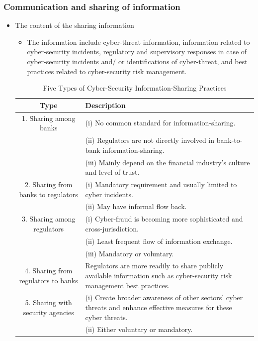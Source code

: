 \subsubsection{Communication and sharing of information}
\begin{itemize}
\item The content of the sharing information
    \begin{itemize}
    \item The information include cyber-threat information, information related to cyber-security incidents, regulatory and supervisory responses in case of cyber-security incidents and/ or identifications of cyber-threat, and best practices related to cyber-security risk management.
    
    \end{itemize}

    \begin{table}[H]
        \centering
        \caption{Five Types of Cyber-Security Information-Sharing Practices}
        \renewcommand{\arraystretch}{1.5} %

        \begin{tabular}{|c|p{12cm}|}
            \hline
            \textbf{Type} & \textbf{Description} \\ \hline
            1. Sharing among banks & (i) No common standard for information-sharing. \\& (ii) Regulators are not directly involved in bank-to-bank information-sharing. \\& (iii) Mainly depend on the financial industry’s culture and level of trust. \\ \hline
            2. Sharing from banks to regulators & (i) Mandatory requirement and usually limited to cyber incidents. \\&(ii) May have informal flow back. \\ \hline
            3. Sharing among regulators & (i) Cyber-fraud is becoming more sophisticated and cross-jurisdiction. \\&(ii) Least frequent flow of information exchange. \\&(iii) Mandatory or voluntary. \\ \hline
            4. Sharing from regulators to banks & Regulators are more readily to share publicly available information such as cyber-security risk management best practices. \\ \hline
            5. Sharing with security agencies & (i) Create broader awareness of other sectors’ cyber threats and enhance effective measures for these cyber threats. \\&(ii) Either voluntary or mandatory. \\ \hline
        \end{tabular}
    \end{table}
\end{itemize}




